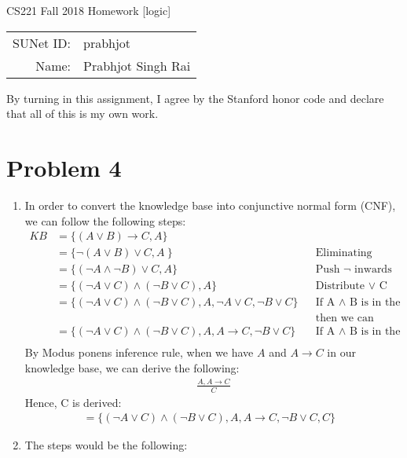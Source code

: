 \documentclass[12pt]{article}
\begin{document}
\begin{center}
{\Large CS221 Fall 2018 Homework [logic]}

\begin{tabular}{rl}
SUNet ID: & prabhjot \\
Name: & Prabhjot Singh Rai
\end{tabular}
\end{center}

By turning in this assignment, I agree by the Stanford honor code and declare
that all of this is my own work.

\section*{Problem 4}

\begin{enumerate}[label=(\alph*)]
  \item In order to convert the knowledge base into conjunctive normal form (CNF), we can follow the following steps:
  \begin{align*}
  KB &= \{ (A \lor B ) \rightarrow C, A\} \\
  &= \{ \neg (A \lor B) \lor C, A \ \} && \text{Eliminating Implications} \\
  &= \{ (\neg A \land \neg B) \lor C, A \} && \text{Push $\neg$ inwards} \\
  &= \{ ( \neg A \lor C ) \land ( \neg B \lor C ), A \} && \text{Distribute $\lor$ C} \\
  &= \{ ( \neg A \lor C ) \land ( \neg B \lor C ), A, \neg A \lor C, \neg B \lor C \} && \text{If A $\land$ B is in the knowledge base, } \\
  &   && \text{then we can derive both A and  B} \\
  &= \{ ( \neg A \lor C ) \land ( \neg B \lor C ), A, A \rightarrow C, \neg B \lor C \} && \text{If A $\land$ B is in the knowledge base, } \\
  \end{align*}
  By Modus ponens inference rule, when we have $A$ and $A \rightarrow C$ in our knowledge base, we can derive the following:
  \begin{align*}
  \frac{A, A \rightarrow C}{C}
  \end{align*}
  Hence, C is derived:
  \begin{align*}
  &= \{ ( \neg A \lor C ) \land ( \neg B \lor C ), A, A \rightarrow C, \neg B \lor C, C \} &&
  \end{align*}
  \item The steps would be the following:

\end{enumerate}
\end{document}
